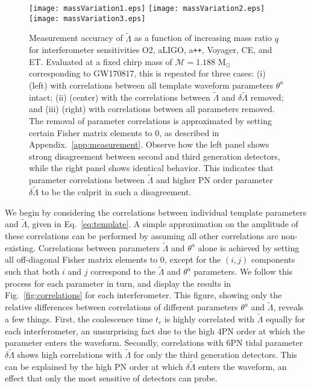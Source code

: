 \documentclass[prd,twocolumn,nofootinbib,superscriptaddress,amsmath,amssymb]{revtex4-1}
\begin{document}
\begin{figure*}
\begin{center} 
\texttt{[image: massVariation1.eps]}
\texttt{[image: massVariation2.eps]}
\texttt{[image: massVariation3.eps]}
\end{center}
\caption{
Measurement accuracy of $\tilde\Lambda$ as a function of increasing mass ratio $q$ for interferometer sensitivities O2, aLIGO, a\texttt{++}, Voyager, CE, and ET.
Evaluated at a fixed chirp mass of $\mathcal{M}=1.188\text{ M}_{\odot}$ corresponding to GW170817, this is repeated for three cases: (i) (left) with correlations between all template waveform parameters $\theta^a$ intact; (ii) (center) with the correlations between $\tilde\Lambda$ and $\delta\tilde\Lambda$ removed; and (iii) (right) with correlations between all parameters removed.
The removal of parameter correlations is approximated by setting certain Fisher matrix elements to 0, as described in Appendix.~\ref{app:measurement}.
Observe how the left panel shows strong disagreement between second and third generation detectors, while the right panel shows identical behavior.
This indicates that parameter correlations between $\tilde\Lambda$ and higher PN order parameter $\delta\tilde\Lambda$ to be the culprit in such a disagreement.
}
\label{fig:massVariation}
\end{figure*} 

We begin by considering the correlations between individual template parameters and $\tilde\Lambda$, given in Eq.~\ref{eq:template}.
A simple approximation on the amplitude of these correlations can be performed by assuming all other correlations are non-existing.
Correlations between parameters $\tilde\Lambda$ and $\theta^a$ alone is achieved by setting all off-diagonal Fisher matrix elements to $0$, except for the $(i,j)$ components such that both $i$ and $j$ correspond to the $\tilde\Lambda$ and $\theta^a$ parameters.
We follow this process for each parameter in turn, and display the results in Fig.~\ref{fig:correlations} for each interferometer.
This figure, showing only the relative differences between correlations of different parameters $\theta^a$ and $\tilde\Lambda$, reveals a few things.
First, the coalescence time $t_c$ is highly correlated with $\tilde\Lambda$ equally for each interferometer, an unsurprising fact due to the high 4PN order at which the parameter enters the waveform.
Secondly, correlations with 6PN tidal parameter $\delta\tilde\Lambda$ shows high correlations with $\tilde\Lambda$ for only the third generation detectors.
This can be explained by the high PN order at which $\delta\tilde\Lambda$ enters the waveform, an effect that only the most sensitive of detectors can probe. 
\end{document}
